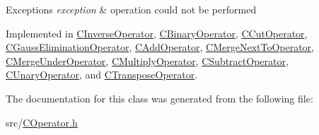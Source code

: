\begin{DoxyExceptions}{Exceptions}
{\em exception} & operation could not be performed \\
\hline
\end{DoxyExceptions}


Implemented in \hyperlink{classCInverseOperator_a72d6bb822dcc0d7944c9aaf53fa62b9f}{C\+Inverse\+Operator}, \hyperlink{classCBinaryOperator_aea1eef33f83a4e395091daa0637f4c77}{C\+Binary\+Operator}, \hyperlink{classCCutOperator_a146755b24696c85270885bb71c29d82d}{C\+Cut\+Operator}, \hyperlink{classCGaussEliminationOperator_a040e193c6ddf7246962361db398effc2}{C\+Gauss\+Elimination\+Operator}, \hyperlink{classCAddOperator_a7fb8e83b7c5831e3f2e6e8544af49523}{C\+Add\+Operator}, \hyperlink{classCMergeNextToOperator_ab914c0ae204819b6f5e9d9857acd1854}{C\+Merge\+Next\+To\+Operator}, \hyperlink{classCMergeUnderOperator_a4b17a385b3f261bd9a5ab3cb4403e9fb}{C\+Merge\+Under\+Operator}, \hyperlink{classCMultiplyOperator_a328c99de6116b51ef3aa52705a748a85}{C\+Multiply\+Operator}, \hyperlink{classCSubtractOperator_a09c75b8486a0056f82dcec6a5f9fcc58}{C\+Subtract\+Operator}, \hyperlink{classCUnaryOperator_a17b01d9de023a58642f6fd82f214cde0}{C\+Unary\+Operator}, and \hyperlink{classCTransposeOperator_a5d1e43b7997fae8e16bb48143dedea56}{C\+Transpose\+Operator}.



The documentation for this class was generated from the following file\+:\begin{DoxyCompactItemize}
\item 
src/\hyperlink{COperator_8h}{C\+Operator.\+h}\end{DoxyCompactItemize}
